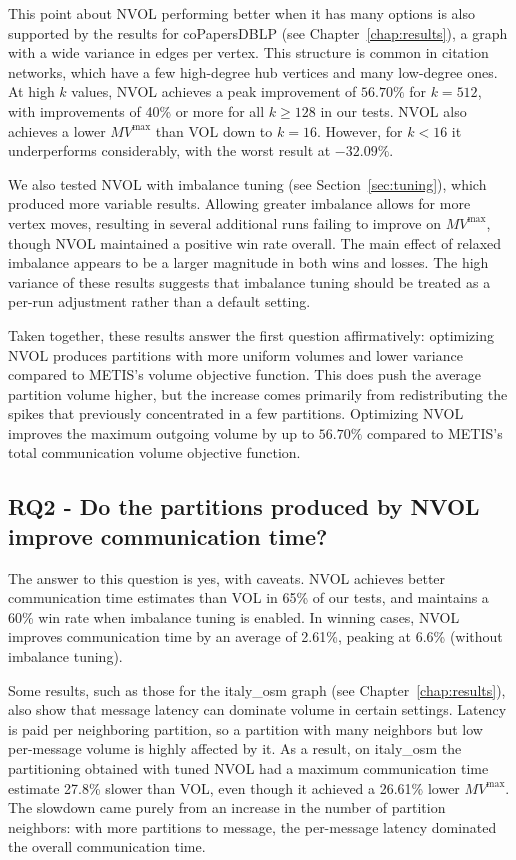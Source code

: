 This point about NVOL performing better when it has many options is also supported by the results for coPapersDBLP (see Chapter~\ref{chap:results}), a graph with a wide variance in edges per vertex. This structure is common in citation networks, which have a few high-degree hub vertices and many low-degree ones. At high $k$ values, NVOL achieves a peak improvement of $56.70\%$ for $k=512$, with improvements of 40\% or more for all $k \geq 128$ in our tests. NVOL also achieves a lower $MV^{\mathrm{max}}$ than VOL down to $k = 16$. However, for $k < 16$ it underperforms considerably, with the worst result at $-32.09\%$.

We also tested NVOL with imbalance tuning (see Section~\ref{sec:tuning}), which produced more variable results. Allowing greater imbalance allows for more vertex moves, resulting in several additional runs failing to improve on $MV^{\mathrm{max}}$, though NVOL maintained a positive win rate overall. The main effect of relaxed imbalance appears to be a larger magnitude in both wins and losses. The high variance of these results suggests that imbalance tuning should be treated as a per-run adjustment rather than a default setting.

Taken together, these results answer the first question affirmatively: optimizing NVOL produces partitions with more uniform volumes and lower variance compared to METIS's volume objective function. This does push the average partition volume higher, but the increase comes primarily from redistributing the spikes that previously concentrated in a few partitions. Optimizing NVOL improves the maximum outgoing volume by up to $56.70\%$ compared to METIS's total communication volume objective function.

\subsection{RQ2 - Do the partitions produced by NVOL improve communication time?}
The answer to this question is yes, with caveats. NVOL achieves better communication time estimates than VOL in 65\% of our tests, and maintains a 60\% win rate when imbalance tuning is enabled. In winning cases, NVOL improves communication time by an average of 2.61\%, peaking at 6.6\% (without imbalance tuning). 

Some results, such as those for the italy\_osm graph (see Chapter~\ref{chap:results}), also show that message latency can dominate volume in certain settings. Latency is paid per neighboring partition, so a partition with many neighbors but low per-message volume is highly affected by it. As a result, on italy\_osm the partitioning obtained with tuned NVOL had a maximum communication time estimate 27.8\% slower than VOL, even though it achieved a 26.61\% lower $MV^{\mathrm{max}}$. The slowdown came purely from an increase in the number of partition neighbors: with more partitions to message, the per-message latency dominated the overall communication time.

